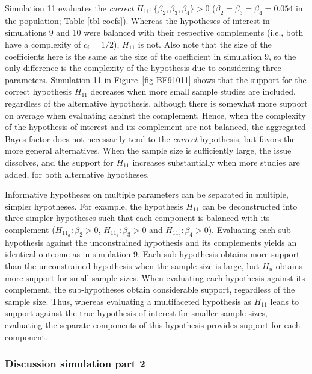 \documentclass[
]{interact}
\begin{document}
Simulation 11 evaluates the \emph{correct}
\(H_{11}: \{\beta_2, \beta_3, \beta_4\} > 0\)
(\(\beta_2 = \beta_3 = \beta_4 = 0.054\) in the population; Table
\ref{tbl-coefs}). Whereas the hypotheses of interest in simulations 9
and 10 were balanced with their respective complements (i.e., both have
a complexity of \(c_i = 1/2\)), \(H_{11}\) is not. Also note that the
size of the coefficients here is the same as the size of the coefficient
in simulation 9, so the only difference is the complexity of the
hypothesis due to considering three parameters. Simulation 11 in
Figure~\ref{fig-BF91011} shows that the support for the correct
hypothesis \(H_{11}\) decreases when more small sample studies are
included, regardless of the alternative hypothesis, although there is
somewhat more support on average when evaluating against the complement.
Hence, when the complexity of the hypothesis of interest and its
complement are not balanced, the aggregated Bayes factor does not
necessarily tend to the \emph{correct} hypothesis, but favors the more
general alternatives. When the sample size is sufficiently large, the
issue dissolves, and the support for \(H_{11}\) increases substantially
when more studies are added, for both alternative hypotheses.

Informative hypotheses on multiple parameters can be separated in
multiple, simpler hypotheses. For example, the hypothesis \(H_{11}\) can
be deconstructed into three simpler hypotheses such that each component
is balanced with its complement (\(H_{11_a}: \beta_2 > 0\),
\(H_{11_b}: \beta_3 > 0\) and \(H_{11_c}: \beta_4 > 0\)). Evaluating
each sub-hypothesis against the unconstrained hypothesis and its
complements yields an identical outcome as in simulation 9. Each
sub-hypothesis obtains more support than the unconstrained hypothesis
when the sample size is large, but \(H_u\) obtains more support for
small sample sizes. When evaluating each hypothesis against its
complement, the sub-hypotheses obtain considerable support, regardless
of the sample size. Thus, whereas evaluating a multifaceted hypothesis
as \(H_{11}\) leads to support against the true hypothesis of interest
for smaller sample sizes, evaluating the separate components of this
hypothesis provides support for each component.

\hypertarget{discussion-simulation-part-2}{%
\subsubsection{Discussion simulation part
2}\label{discussion-simulation-part-2}}
\end{document}
